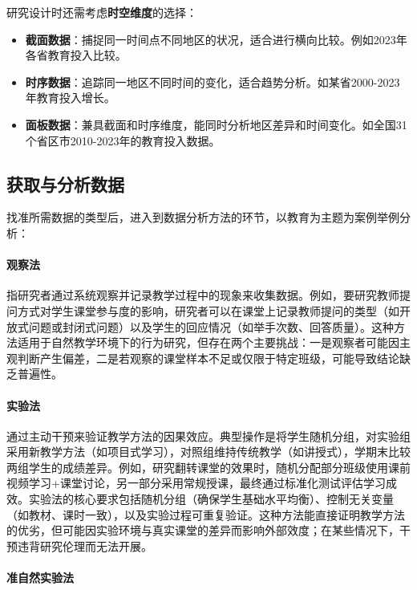 研究设计时还需考虑\textbf{时空维度}的选择：

\begin{itemize}
	\item
	\textbf{截面数据}：捕捉同一时间点不同地区的状况，适合进行横向比较。例如2023年各省教育投入比较。
	\item
	\textbf{时序数据}：追踪同一地区不同时间的变化，适合趋势分析。如某省2000-2023年教育投入增长。
	\item
	\textbf{面板数据}：兼具截面和时序维度，能同时分析地区差异和时间变化。如全国31个省区市2010-2023年的教育投入数据。
\end{itemize}

\subsection{获取与分析数据}

找准所需数据的类型后，进入到数据分析方法的环节，以教育为主题为案例举例分析：

\paragraph*{观察法}

指研究者通过系统观察并记录教学过程中的现象来收集数据。例如，要研究教师提问方式对学生课堂参与度的影响，研究者可以在课堂上记录教师提问的类型（如开放式问题或封闭式问题）以及学生的回应情况（如举手次数、回答质量）。这种方法适用于自然教学环境下的行为研究，但存在两个主要挑战：一是观察者可能因主观判断产生偏差，二是若观察的课堂样本不足或仅限于特定班级，可能导致结论缺乏普遍性。

\paragraph*{实验法}

通过主动干预来验证教学方法的因果效应。典型操作是将学生随机分组，对实验组采用新教学方法（如项目式学习），对照组维持传统教学（如讲授式），学期末比较两组学生的成绩差异。例如，研究翻转课堂的效果时，随机分配部分班级使用课前视频学习+课堂讨论，另一部分采用常规授课，最终通过标准化测试评估学习成效。实验法的核心要求包括随机分组（确保学生基础水平均衡）、控制无关变量（如教材、课时一致），以及实验过程可重复验证。这种方法能直接证明教学方法的优劣，但可能因实验环境与真实课堂的差异而影响外部效度；在某些情况下，干预违背研究伦理而无法开展。

\paragraph*{准自然实验法}

